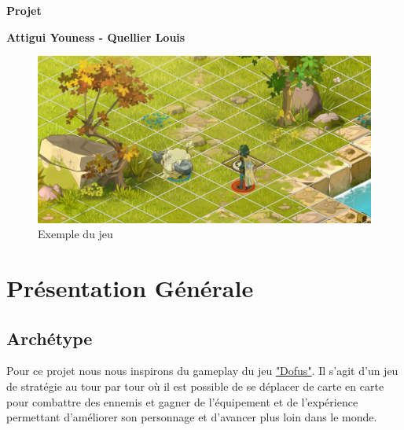 \documentclass[a4paper,12pt]{article}
\begin{document}
\thispagestyle{empty}

\begin{titlepage}

\vspace*{2cm}

\begin{center}\textbf{\Huge Projet }\end{center}{\Large \par}

\begin{center}\textbf{\large Attigui Youness - Quellier Louis}\end{center}{\large \par}

\vspace{2cm}

  \begin{figure}[ht]
        \centering
        \includegraphics[width=\textwidth]{dofus.png}
        \caption{Exemple du jeu}
    \end{figure}


\clearpage

{\small
\tableofcontents
}

\end{titlepage}

\clearpage
\section {Présentation Générale}

\subsection{Archétype}
    Pour ce projet nous nous inspirons du gameplay du jeu \href{http://www.jeuxvideo.com/jeux/pc/00013232-dofus.htm}{"Dofus"}. Il s'agit d'un jeu de stratégie au tour par tour où il est possible de se déplacer de carte en carte pour combattre des ennemis et gagner de l'équipement et de l'expérience permettant d'améliorer son personnage et d'avancer plus loin dans le monde.
\end{document}
